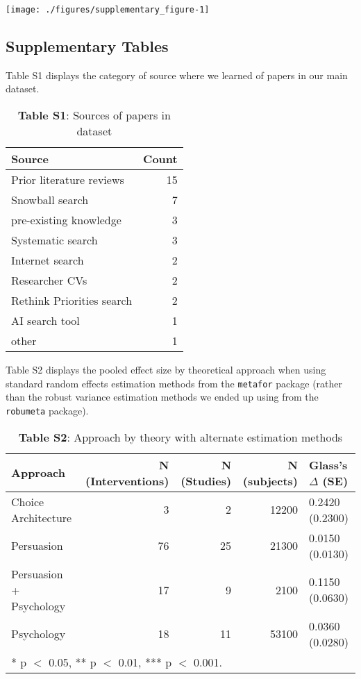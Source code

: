 \documentclass[sn-nature,pdflatex]{sn-jnl}
\begin{document}
\texttt{[image: ./figures/supplementary\_figure-1]}

\subsection{Supplementary Tables}\label{supplementary-tables}

Table S1 displays the category of source where we learned of papers in
our main dataset. \captionsetup[table]{labelformat=empty}

\begin{table}[!h]
\centering
\caption{\label{tab:supp_table_one}\textbf{Table S1}: Sources of papers in dataset}
\centering
\begin{tabular}[t]{lr}
\toprule
Source & Count\\
\midrule
Prior literature reviews & 15\\
Snowball search & 7\\
pre-existing knowledge & 3\\
Systematic search & 3\\
Internet search & 2\\
\addlinespace
Researcher CVs & 2\\
Rethink Priorities search & 2\\
AI search tool & 1\\
other & 1\\
\bottomrule
\end{tabular}
\end{table}

Table S2 displays the pooled effect size by theoretical approach when
using standard random effects estimation methods from the
\texttt{metafor} package (rather than the robust variance estimation
methods we ended up using from the \texttt{robumeta} package).

\begin{table}[!h]
\centering
\caption{\label{tab:supp_table_two}\textbf{Table S2}: Approach by theory with alternate estimation methods }
\centering
\begin{tabular}[t]{lrrrl}
\toprule
Approach & N (Interventions) & N (Studies) & N (subjects) & Glass's $\Delta$ (SE)\\
\midrule
Choice Architecture & 3 & 2 & 12200 & 0.2420 (0.2300)\\
Persuasion & 76 & 25 & 21300 & 0.0150 (0.0130)\\
Persuasion + Psychology & 17 & 9 & 2100 & 0.1150 (0.0630)\\
Psychology & 18 & 11 & 53100 & 0.0360 (0.0280)\\
\bottomrule
\multicolumn{5}{l}{\rule{0pt}{1em}* p $<$ 0.05, ** p $<$ 0.01, *** p $<$ 0.001.}\\
\end{tabular}
\end{table}
\end{document}
